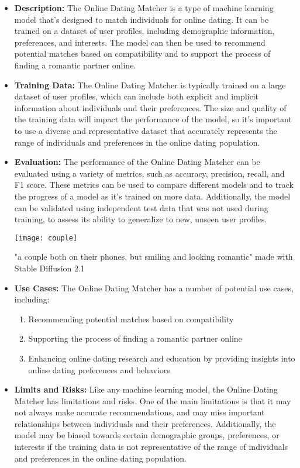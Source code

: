 \begin{itemize}
\begin{itemize}
    \item \textbf{Description:} The Online Dating Matcher is a type of machine learning model that's designed to match individuals for online dating. It can be trained on a dataset of user profiles, including demographic information, preferences, and interests. The model can then be used to recommend potential matches based on compatibility and to support the process of finding a romantic partner online.
    \item \textbf{Training Data:} The Online Dating Matcher is typically trained on a large dataset of user profiles, which can include both explicit and implicit information about individuals and their preferences. The size and quality of the training data will impact the performance of the model, so it's important to use a diverse and representative dataset that accurately represents the range of individuals and preferences in the online dating population.
    \item \textbf{Evaluation:} The performance of the Online Dating Matcher can be evaluated using a variety of metrics, such as accuracy, precision, recall, and F1 score. These metrics can be used to compare different models and to track the progress of a model as it's trained on more data. Additionally, the model can be validated using independent test data that was not used during training, to assess its ability to generalize to new, unseen user profiles.
\begin{marginfigure}[-5.5cm]
        \texttt{[image: couple]}
        \caption{"a couple both on their phones, but smiling and looking romantic" made with Stable Diffusion 2.1}
\end{marginfigure}
    \item \textbf{Use Cases:} The Online Dating Matcher has a number of potential use cases, including:
        \begin{enumerate}  
            \item Recommending potential matches based on compatibility
            \item Supporting the process of finding a romantic partner online
            \item Enhancing online dating research and education by providing insights into online dating preferences and behaviors
        \end{enumerate}
    \item \textbf{Limits and Risks:} Like any machine learning model, the Online Dating Matcher has limitations and risks. One of the main limitations is that it may not always make accurate recommendations, and may miss important relationships between individuals and their preferences. Additionally, the model may be biased towards certain demographic groups, preferences, or interests if the training data is not representative of the range of individuals and preferences in the online dating population.

\end{itemize}
\end{itemize}
